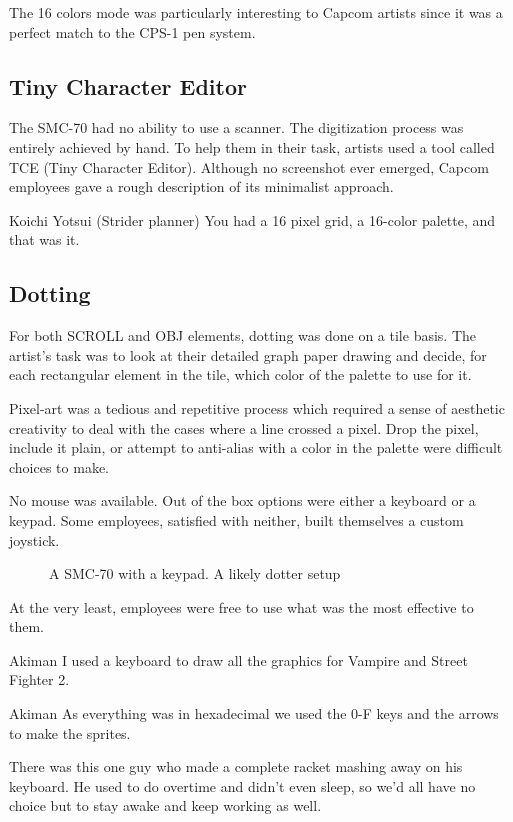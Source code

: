 The 16 colors mode was particularly interesting to Capcom artists since it was a perfect match to the CPS-1 pen system.


\subsection{Tiny Character Editor}

The SMC-70 had no ability to use a scanner. The digitization process was entirely achieved by hand. To help them in their task, artists used a tool called TCE (Tiny Character Editor). Although no screenshot ever emerged, Capcom employees gave a rough description of its minimalist approach.

\begin{q}{Koichi Yotsui (Strider planner)}
You had a 16 pixel grid, a 16-color palette, and that was it.
\end{q}


\subsection{Dotting}
For both SCROLL and OBJ elements, dotting was done on a tile basis. The artist's task was to look at their detailed graph paper drawing and decide, for each rectangular element in the tile, which color of the palette to use for it.

Pixel-art was a tedious and repetitive process which required a sense of aesthetic creativity to deal with the cases where a line crossed a pixel. Drop the pixel, include it plain, or attempt to anti-alias with a color in the palette were difficult choices to make.

No mouse was available. Out of the box options were either a keyboard or a keypad. Some employees, satisfied with neither, built themselves a custom joystick.


\begin{figure}[H]
\caption*{A SMC-70 with a keypad. A likely dotter setup}
\end{figure}


At the very least, employees were free to use what was the most effective to them.

\begin{q}{Akiman\cite{akiman}}
I used a keyboard to draw all the graphics for Vampire and Street Fighter 2.
\end{q}



\begin{q}{Akiman\cite{ar20160404}}
  As everything was in hexadecimal we used the 0-F keys and the arrows to make the sprites. 

  There was this one guy who made a complete racket mashing away on his keyboard. He used to do overtime and didn't even sleep, so we'd all have no choice but to stay awake and keep working as well.
\end{q}


